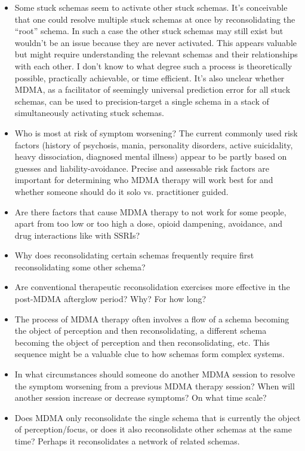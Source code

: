 \documentclass[11pt,oneside]{book}
\begin{document}
\begin{itemize}
    \item Some stuck schemas seem to activate other stuck schemas. It's conceivable that one could resolve multiple stuck schemas at once by reconsolidating the \enquote{root} schema. In such a case the other stuck schemas may still exist but wouldn't be an issue because they are never activated. This appears valuable but might require understanding the relevant schemas and their relationships with each other. I don't know to what degree such a process is theoretically possible, practically achievable, or time efficient. It's also unclear whether MDMA, as a facilitator of seemingly universal prediction error for all stuck schemas, can be used to precision-target a single schema in a stack of simultaneously activating stuck schemas.
    \item Who is most at risk of symptom worsening? The current commonly used risk factors (history of psychosis, mania, personality disorders, active suicidality, heavy dissociation, diagnosed mental illness) appear to be partly based on guesses and liability-avoidance. Precise and assessable risk factors are important for determining who MDMA therapy will work best for and whether someone should do it solo vs. practitioner guided.
    \item Are there factors that cause MDMA therapy to not work for some people, apart from too low or too high a dose, opioid dampening, avoidance, and drug interactions like with SSRIs?
    \item Why does reconsolidating certain schemas frequently require first reconsolidating some other schema?
    \item Are conventional therapeutic reconsolidation exercises more effective in the post-MDMA afterglow period? Why? For how long?
    \item The process of MDMA therapy often involves a flow of a schema becoming the object of perception and then reconsolidating, a different schema becoming the object of perception and then reconsolidating, etc. This sequence might be a valuable clue to how schemas form complex systems.
    \item In what circumstances should someone do another MDMA session to resolve the symptom worsening from a previous MDMA therapy session? When will another session increase or decrease symptoms? On what time scale?
    \item Does MDMA only reconsolidate the single schema that is currently the object of perception/focus, or does it also reconsolidate other schemas at the same time? Perhaps it reconsolidates a network of related schemas.

\end{itemize}
\end{document}

